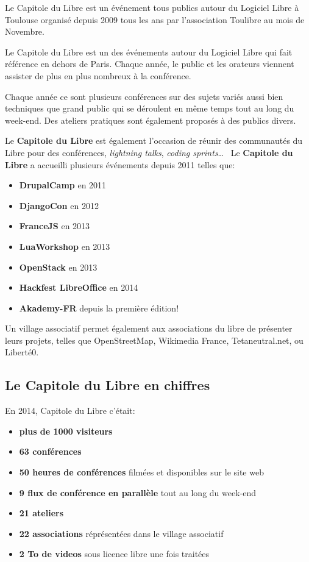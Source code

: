 
Le Capitole du Libre est un événement tous publics autour du Logiciel Libre à Toulouse organisé depuis 2009 tous les ans par l'association Toulibre au mois de Novembre.

Le Capitole du Libre est un des événements autour du Logiciel Libre qui fait référence en dehors de Paris. Chaque année, le public et les orateurs viennent assister de plus en plus nombreux à la conférence. 

Chaque année ce sont plusieurs conférences sur des sujets variés 
aussi bien techniques que grand public qui se déroulent en même temps 
tout au long du week-end. Des ateliers pratiques sont également proposés 
à des publics divers.

\Separateur

Le \textbf{Capitole du Libre} est également l'occasion de réunir des 
communautés du Libre pour des conférences, \textit{lightning talks}, 
\textit{coding sprints}\dots ~ Le \textbf{Capitole du Libre} a 
accueilli plusieurs événements depuis 2011 telles que:
\begin{itemize}[label=$\bullet$]
\item \textbf{DrupalCamp} en 2011
\item \textbf{DjangoCon} en 2012
\item \textbf{FranceJS} en 2013
\item \textbf{LuaWorkshop} en 2013
\item \textbf{OpenStack} en 2013
\item \textbf{Hackfest LibreOffice}  en 2014
\item \textbf{Akademy-FR} depuis la première édition!
\end{itemize}

\Separateur

Un village associatif permet également aux associations du libre de présenter 
leurs projets, telles que OpenStreetMap, Wikimedia France, 
Tetaneutral.net, ou Liberté0.

\subsection{Le Capitole du Libre en chiffres}

En 2014, Capitole du Libre c'était:
\begin{itemize}[label=$\bullet$]
\item \textbf{plus de 1000 visiteurs}
\item \textbf{63 conférences}
\item \textbf{50 heures de conférences} filmées et disponibles sur le site web
\item \textbf{9 flux de conférence en parallèle} tout au long du week-end
\item \textbf{21 ateliers}
\item \textbf{22 associations} réprésentées dans le village associatif
\item \textbf{2 To de videos} sous licence libre une fois traitées
\end{itemize}

